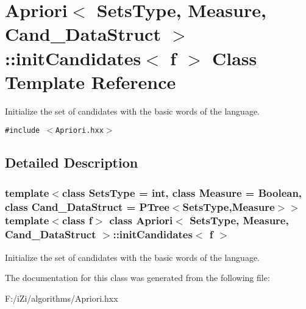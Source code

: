 \section{Apriori$<$ Sets\-Type, Measure, Cand\_\-Data\-Struct $>$::init\-Candidates$<$ f $>$ Class Template Reference}
\label{class_apriori_1_1init_candidates}
Initialize the set of candidates with the basic words of the language.  


{\tt \#include $<$Apriori.hxx$>$}



\subsection{Detailed Description}
\subsubsection*{template$<$class Sets\-Type = int, class Measure = Boolean, class Cand\_\-Data\-Struct = PTree$<$Sets\-Type,Measure$>$$>$template$<$class f$>$ class Apriori$<$ Sets\-Type, Measure, Cand\_\-Data\-Struct $>$::init\-Candidates$<$ f $>$}

Initialize the set of candidates with the basic words of the language. 



The documentation for this class was generated from the following file:\begin{CompactItemize}
\item 
F:/i\-Zi/algorithms/Apriori.hxx\end{CompactItemize}
